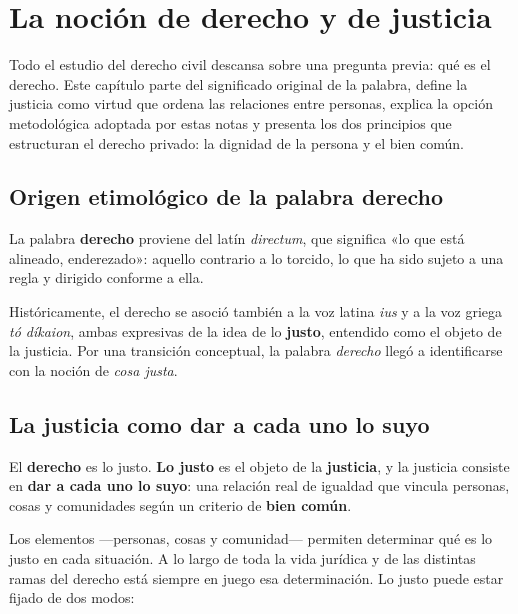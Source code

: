 \documentclass[12pt,oneside]{book}
\begin{document}
\chapter{La noción de derecho y de justicia}
\label{cap:justicia}

Todo el estudio del derecho civil descansa sobre una pregunta previa: qué es el derecho. Este capítulo parte del significado original de la palabra, define la justicia como virtud que ordena las relaciones entre personas, explica la opción metodológica adoptada por estas notas y presenta los dos principios que estructuran el derecho privado: la dignidad de la persona y el bien común.

\section{Origen etimológico de la palabra derecho}

La palabra \textbf{derecho} proviene del latín \textit{directum}, que significa «lo que está alineado, enderezado»: aquello contrario a lo torcido, lo que ha sido sujeto a una regla y dirigido conforme a ella.

\begin{definicion}
Históricamente, el derecho se asoció también a la voz latina \textit{ius} y a la voz griega \textit{tó díkaion}, ambas expresivas de la idea de lo \textbf{justo}, entendido como el objeto de la justicia. Por una transición conceptual, la palabra \textit{derecho} llegó a identificarse con la noción de \textit{cosa justa}.
\end{definicion}

\section{La justicia como dar a cada uno lo suyo}

\begin{definicion}
El \textbf{derecho} es lo justo. \textbf{Lo justo} es el objeto de la \textbf{justicia}, y la justicia consiste en \textbf{dar a cada uno lo suyo}: una relación real de igualdad que vincula personas, cosas y comunidades según un criterio de \textbf{bien común}.
\end{definicion}

Los elementos ---personas, cosas y comunidad--- permiten determinar qué es lo justo en cada situación. A lo largo de toda la vida jurídica y de las distintas ramas del derecho está siempre en juego esa determinación. Lo justo puede estar fijado de dos modos:
\end{document}
